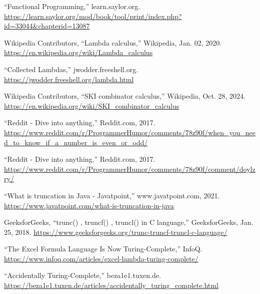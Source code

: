 \documentclass[12pt]{report} %
\begin{document}
\begin{singlespace}
\begin{thebibliography}{}
             “Functional Programming,” learn.saylor.org. \href{https://learn.saylor.org/mod/book/tool/print/index.php?id=33044&chapterid=13087}{https://learn.saylor.org/mod/book/tool/print/\-index.php?id=33044\&chapterid=13087}

             Wikipedia Contributors, “Lambda calculus,” Wikipedia, Jan. 02, 2020. \href{https://en.wikipedia.org/wiki/Lambda_calculus}{https://en.wikipedia.org/wiki/Lambda\_calculus}

             “Collected Lambdas,” jwodder.freeshell.org. \href{https://jwodder.freeshell.org/lambda.html}{https://jwodder.freeshell.org/lambda.html}

             Wikipedia Contributors, “SKI combinator calculus,” Wikipedia, Oct. 28, 2024. \href{https://en.wikipedia.org/wiki/SKI_combinator_calculus}{https://en.wikipedia.org/wiki/SKI\_combinator\_calculus}

             “Reddit - Dive into anything,” Reddit.com, 2017. \href{https://www.reddit.com/r/ProgrammerHumor/comments/78z90f/when_you_need_to_know_if_a_number_is_even_or_odd/}{https://www.reddit.com/r/ProgrammerHu\-mor/comments/78z90f/when\_you\_need\_to\_know\_if\_a\_number\_is\_even\_or\_odd/} 

             “Reddit - Dive into anything,” Reddit.com, 2017. \href{https://www.reddit.com/r/ProgrammerHumor/comments/78z90f/comment/doylzry/}{https://www.reddit.com/r/ProgrammerHu\-mor/comments/78z90f/comment/doylzry/}

             “What is truncation in Java - Javatpoint,” www.javatpoint.com, 2021. \href{https://www.javatpoint.com/what-is-truncation-in-java}{https://www.javatpoint.com/what-is-truncation-in-java}

             GeeksforGeeks, “trunc() , truncf() , truncl() in C language,” GeeksforGeeks, Jan. 25, 2018. \href{https://www.geeksforgeeks.org/trunc-truncf-truncl-c-language/}{https://www.geeksforgeeks.org/trunc-truncf-truncl-c-language/}

             “The Excel Formula Language Is Now Turing-Complete,” InfoQ. \href{https://www.infoq.com/articles/excel-lambda-turing-complete/}{https://www.infoq.com/articles/excel-lambda-turing-complete/}

             “Accidentally Turing-Complete,” beza1e1.tuxen.de. \href{https://beza1e1.tuxen.de/articles/accidentally_turing_complete.html}{https://beza1e1.tuxen.de/articles/accident\-ally\_turing\_complete.html}


\end{thebibliography}
\end{singlespace}
\end{document}
